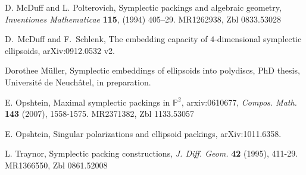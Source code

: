 \documentclass[11pt]{amsart}
\newcommand{\1}{{{\mathchoice {\rm 1\mskip-4mu l} {\rm 1\mskip-4mu l}
{\rm 1\mskip-4.5mu l} {\rm 1\mskip-5mu l}}}}
\newcommand{\PP}{{\mathbb P}}
\numberwithin{figure}{section}
\numberwithin{equation}{section}
\begin{document}
\begin{thebibliography}{cccccc}
D. McDuff and L. Polterovich,  
Symplectic packings and algebraic geometry,
{\it Inventiones Mathematicae} {\bf 115}, (1994) 405--29. 
MR1262938,
Zbl 0833.53028


D.~McDuff and F.~Schlenk, 
The embedding capacity of $4$-dimensional symplectic ellipsoids,
arXiv:0912.0532 v2.

Dorothee M\"uller,
Symplectic embeddings of ellipsoids into polydiscs,
PhD thesis, Universit\'e de Neuch\^atel, 
in preparation.

  E. Opshtein, Maximal symplectic packings in $\PP ^2$,
arxiv:0610677, {\it Compos. Math.} {\bf 143} (2007), 1558-1575.
MR2371382,
Zbl 1133.53057 

  E. Opshtein, Singular polarizations and ellipsoid packings, arXiv:1011.6358.

 L. Traynor, Symplectic packing constructions, 
      {\it J. Diff. Geom.} {\bf 42} (1995), 411-29.
      MR1366550,
Zbl 0861.52008

\end{thebibliography}
\end{document}
